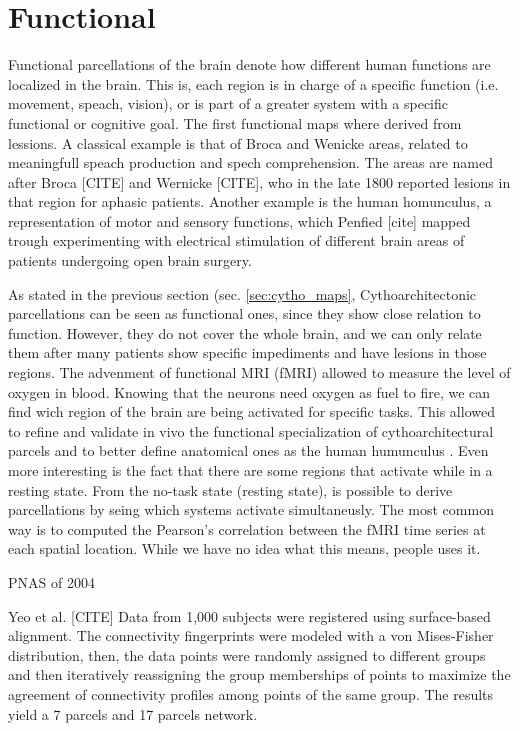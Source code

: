 \section{Functional}
Functional parcellations of the brain denote how different human functions 
are localized in the brain. This is, each region is in charge of a specific
function (i.e. movement, speach, vision), or is part of a greater system with
a specific functional or cognitive goal. The first functional maps where derived
from lessions. A classical example is that of Broca and Wenicke areas, related
to meaningfull speach production and spech comprehension. The areas are named
after Broca [CITE] and Wernicke [CITE], who in the late 1800 reported lesions in
that region for aphasic patients. Another example is the human homunculus,
a representation of motor and sensory functions, which Penfied [cite] mapped
trough experimenting with electrical stimulation of different brain areas of
patients undergoing open brain surgery.

As stated in the previous section (sec. \ref{sec:cytho_maps}, Cythoarchitectonic
parcellations can be seen as functional ones, since they show close relation 
to function. However, they do not cover the whole brain, and we can only relate
them after many patients show specific impediments and have lesions in those
regions. The advenment of functional MRI (fMRI) allowed to measure the level of
oxygen in blood. Knowing that the neurons need oxygen as fuel to fire, we can
find wich region of the brain are being activated for specific tasks. This
allowed to refine and validate in vivo the functional specialization of 
cythoarchitectural parcels and to better define anatomical ones as the human
humunculus \cite{Lashkari2010, Michel2011}. Even more interesting is the fact
that there are some regions that activate while in a resting state. From the
no-task state (resting state), is possible to derive parcellations by seing
which systems activate simultaneusly. The most common way is to computed the
Pearson's correlation between the fMRI time series at each spatial location.
While we have no idea what this means, people uses it. 

PNAS of 2004 \cite{Johansen-Berg2004}


Yeo et al. [CITE] 
Data from 1,000 subjects were registered using surface-based alignment.
The connectivity fingerprints were modeled with a von Mises-Fisher distribution,
then, the data points were randomly assigned to different groups and then
iteratively reassigning the group memberships of points to maximize the
agreement of connectivity profiles among points of the same group. The results
yield a 7 parcels and 17 parcels network.

